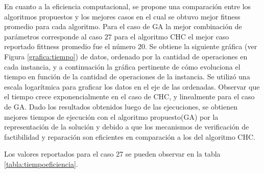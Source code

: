 \documentclass[journal]{IEEEtran}
\begin{document}
En cuanto a la eficiencia computacional, se propone una comparación entre los algoritmos propuestos y los mejores casos en el cual se obtuvo mejor fitness promedio para cada algoritmo. Para el caso de GA la mejor combinación de parámetros corresponde al caso $27$ para el algoritmo CHC el mejor caso reportado fittness promedio fue el número $20$. Se obtiene la siguiente gráfica (ver Figura \ref{grafica:tiempo}) de datos, ordenado por la cantidad de operaciones en cada instancia, y a continuación la gráfica pertinente de cómo evoluciona el tiempo en función de la cantidad de operaciones de la instancia. Se utilizó una escala logarítmica para graficar los datos en el eje de las ordenadas. Observar que el tiempo crece exponencialmente en el caso de CHC, y linealmente para el caso de GA. Dado los resultados obtenidos luego de las ejecuciones, se obtienen mejores tiempos de ejecución con el algoritmo propuesto(GA) por la representación de la solución y debido a que los mecanismos de verificación de factibilidad y reparación son eficientes en comparación a los del algoritmo CHC.

Los valores reportados para el caso 27 se pueden observar en la tabla \ref{tabla:tiempoeficiencia}.
\end{document}
